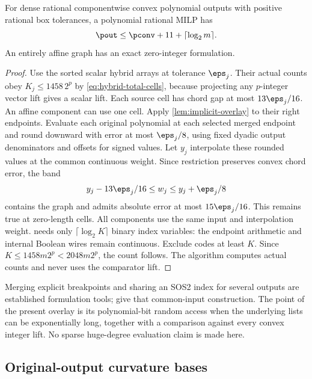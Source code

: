 \begin{theorem}\label{thm:convex-vector-overlay}
For dense rational componentwise convex polynomial outputs with positive
rational box tolerances, a polynomial rational MILP has
\[
 \pout\le\pconv+11+\lceil\log_2m\rceil.
\]
An entirely affine graph has an exact zero-integer formulation.
\end{theorem}
\begin{proof}
Use the sorted scalar hybrid arrays at tolerance $\eps_j$. Their actual
counts obey $K_j\le1458\,2^p$ by \eqref{eq:hybrid-total-cells}, because
projecting any $p$-integer vector lift gives a scalar lift. Each source
cell has chord gap at most $13\eps_j/16$. An affine component can use
one cell. Apply \cref{lem:implicit-overlay} to their right endpoints.
Evaluate each original polynomial at each selected merged endpoint
and round downward with error at most $\eps_j/8$, using fixed dyadic
output denominators and offsets for signed values. Let $y_j$ interpolate
these rounded values at the common continuous weight. Since restriction
preserves convex chord error, the band
\begin{equation}\label{eq:vector-directed-band}
 y_j-13\eps_j/16\le w_j\le y_j+\eps_j/8
\end{equation}
contains the graph and admits absolute error at most $15\eps_j/16$.
This remains true at zero-length cells. All components use the same
input and interpolation weight.  needs
only $\lceil\log_2K\rceil$ binary index variables: the endpoint
arithmetic and internal Boolean wires remain continuous. Exclude codes
at least $K$. Since $K\le1458m2^p<2048m2^p$, the count follows.
The algorithm computes actual counts and never uses the comparator lift.
\end{proof}

Merging explicit breakpoints and sharing an SOS2 index for several outputs
are established formulation tools; \citet[Section 3, Proposition 1]{lyu2026}
give that common-input construction. The point of the present overlay is
its polynomial-bit random access when the underlying lists can be
exponentially long, together with a comparison against every convex
integer lift. No sparse huge-degree evaluation claim is made here.

\subsection{Original-output curvature bases}

